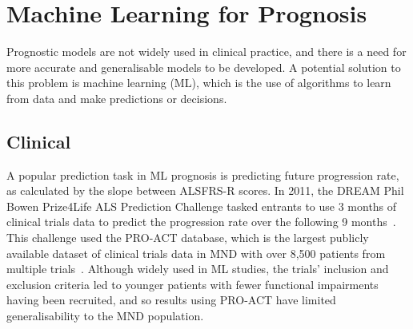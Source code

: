 \section{Machine Learning for Prognosis}

Prognostic models are not widely used in clinical practice, and there is a need for more accurate and generalisable models to be developed.
A potential solution to this problem is machine learning (ML), which is the use of algorithms to learn from data and make predictions or decisions.

\subsection{Clinical}



A popular prediction task in ML prognosis is predicting future progression rate, as calculated by the slope between ALSFRS-R scores.
In 2011, the DREAM Phil Bowen Prize4Life ALS Prediction Challenge tasked entrants to use 3 months of clinical trials data to predict the progression rate over the following 9 months~\cite{kuffnerCrowdsourcedAnalysisClinical2015}.
This challenge used the PRO-ACT database, which is the largest publicly available dataset of clinical trials data in MND with over 8,500 patients from multiple trials~\cite{atassiPROACTDatabaseDesign2014}.
Although widely used in ML studies, the trials' inclusion and exclusion criteria led to younger patients with fewer functional impairments having been recruited, and so results using PRO-ACT have limited generalisability to the MND population.


